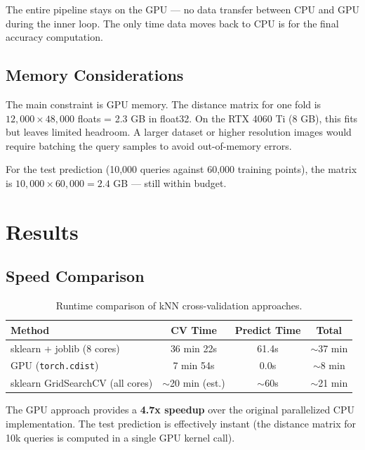 \documentclass[11pt]{article}
\begin{document}
The entire pipeline stays on the GPU --- no data transfer between CPU and GPU during the inner loop. The only time data moves back to CPU is for the final accuracy computation.

\subsection{Memory Considerations}

The main constraint is GPU memory. The distance matrix for one fold is $12{,}000 \times 48{,}000$ floats = 2.3 GB in float32. On the RTX 4060 Ti (8 GB), this fits but leaves limited headroom. A larger dataset or higher resolution images would require batching the query samples to avoid out-of-memory errors.

For the test prediction (10,000 queries against 60,000 training points), the matrix is $10{,}000 \times 60{,}000 = 2.4$ GB --- still within budget.

\section{Results}

\subsection{Speed Comparison}

\begin{table}[H]
	\centering
	\caption{Runtime comparison of kNN cross-validation approaches.}
	\begin{tabular}{lccc}
		\toprule
		Method                           & CV Time             & Predict Time & Total        \\
		\midrule
		sklearn + joblib (8 cores)       & 36 min 22s          & 61.4s        & $\sim$37 min \\
		GPU (\texttt{torch.cdist})       & 7 min 54s           & 0.0s         & $\sim$8 min  \\
		sklearn GridSearchCV (all cores) & $\sim$20 min (est.) & $\sim$60s    & $\sim$21 min \\
		\bottomrule
	\end{tabular}
	\label{tab:speed}
\end{table}

The GPU approach provides a \textbf{4.7x speedup} over the original parallelized CPU implementation. The test prediction is effectively instant (the distance matrix for 10k queries is computed in a single GPU kernel call).
\end{document}
